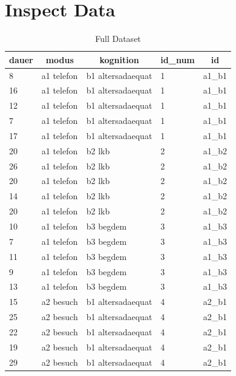 \documentclass[
  doc,floatsintext]{apa6}
\begin{document}
\clearpage

\hypertarget{inspect-data}{%
\section{Inspect Data}\label{inspect-data}}

\begin{table}[tbp]

\begin{center}
\begin{threeparttable}

\caption{\label{tab:tabinspect}Full Dataset}

\begin{tabular}{lllll}
\toprule
dauer & \multicolumn{1}{c}{modus} & \multicolumn{1}{c}{kognition} & \multicolumn{1}{c}{id\_num} & \multicolumn{1}{c}{id}\\
\midrule
8 & a1 telefon & b1 altersadaequat & 1 & a1\_b1\\
16 & a1 telefon & b1 altersadaequat & 1 & a1\_b1\\
12 & a1 telefon & b1 altersadaequat & 1 & a1\_b1\\
7 & a1 telefon & b1 altersadaequat & 1 & a1\_b1\\
17 & a1 telefon & b1 altersadaequat & 1 & a1\_b1\\
20 & a1 telefon & b2 lkb & 2 & a1\_b2\\
26 & a1 telefon & b2 lkb & 2 & a1\_b2\\
20 & a1 telefon & b2 lkb & 2 & a1\_b2\\
14 & a1 telefon & b2 lkb & 2 & a1\_b2\\
20 & a1 telefon & b2 lkb & 2 & a1\_b2\\
10 & a1 telefon & b3 begdem & 3 & a1\_b3\\
7 & a1 telefon & b3 begdem & 3 & a1\_b3\\
11 & a1 telefon & b3 begdem & 3 & a1\_b3\\
9 & a1 telefon & b3 begdem & 3 & a1\_b3\\
13 & a1 telefon & b3 begdem & 3 & a1\_b3\\
15 & a2 besuch & b1 altersadaequat & 4 & a2\_b1\\
25 & a2 besuch & b1 altersadaequat & 4 & a2\_b1\\
22 & a2 besuch & b1 altersadaequat & 4 & a2\_b1\\
19 & a2 besuch & b1 altersadaequat & 4 & a2\_b1\\
29 & a2 besuch & b1 altersadaequat & 4 & a2\_b1\\

\end{tabular}
\end{threeparttable}
\end{center}
\end{table}
\end{document}

